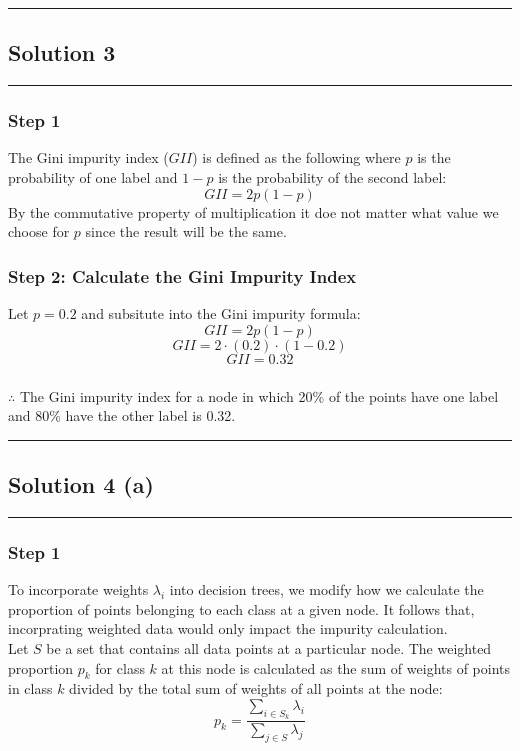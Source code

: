 \documentclass{article}
\begin{document}
\noindent\rule{\textwidth}{0.4pt}

\newpage

\subsection*{Solution 3}
\noindent\rule{\textwidth}{0.4pt}

\subsubsection*{Step 1}
\parbox{\textwidth}{
  The Gini impurity index ($GII$) is defined as the following where $p$ is the probability of one label and $1-p$ is the probability of the second label:
  $$GII=2p(1-p)$$
  By the commutative property of multiplication it doe not matter what value we choose for $p$ since the result will be the same.
}

\subsubsection*{Step 2: Calculate the Gini Impurity Index}
\parbox{\textwidth}{
Let $p=0.2$ and subsitute into the Gini impurity formula:
$$GII=2p(1-p)$$
$$GII=2\cdot(0.2)\cdot(1-0.2)$$
$$GII=0.32$$
}

\subsubsection*{\normalfont}{$\therefore$ The Gini impurity index for a node in which 20\% of the points have one label and 80\% have the other label is 0.32.}

\noindent\rule{\textwidth}{0.4pt}

\newpage

\subsection*{Solution 4 (a)}
\noindent\rule{\textwidth}{0.4pt}

\subsubsection*{Step 1}
\parbox{\textwidth}{
To incorporate weights $\lambda_i$ into decision trees, we modify how we calculate the proportion of points belonging to each class at a given node. 
It follows that, incorprating weighted data would only impact the impurity calculation.\\

Let $S$ be a set that contains all data points at a particular node. The weighted proportion $p_k$ for class $k$ at this node is calculated as the sum of weights of points in class $k$ divided by the total sum of weights of all points at the node:
$$ p_k = \frac{\sum_{i \in S_k} \lambda_i}{\sum_{j \in S} \lambda_j} $$

}
\end{document}
